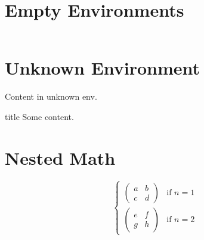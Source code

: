 \documentclass{article}
\begin{document}
\section{Empty Environments}
\begin{equation}
\end{equation}

\begin{itemize}
\end{itemize}

\section{Unknown Environment}
\begin{myenv}
  Content in unknown env.
\end{myenv}

\begin{customblock}{title}
  Some content.
\end{customblock}

\section{Nested Math}
\begin{equation}
  \begin{cases}
    \begin{pmatrix}
    a               & b \\
    c               & d
    \end{pmatrix}   & \text{if } n = 1 \\
    \begin{pmatrix}
    e               & f \\
    g               & h
    \end{pmatrix}   & \text{if } n = 2
  \end{cases}
\end{equation}
\end{document}
